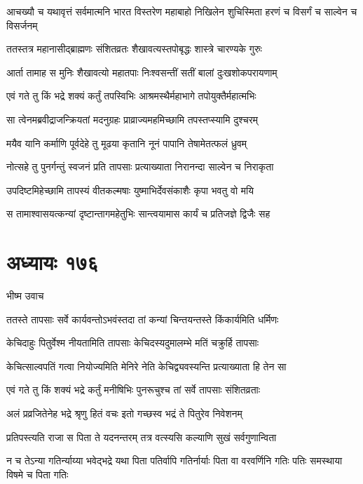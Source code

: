 \threelineshloka
{आचख्यौ च यथावृत्तं सर्वमात्मनि भारत}
{विस्तरेण महाबाहो निखिलेन शुचिस्मिता}
{हरणं च विसर्गं च साल्वेन च विसर्जनम्}


\twolineshloka
{ततस्तत्र महानासीद्ब्राह्मणः संशितव्रतः}
{शैखावत्यस्तपोबृद्धः शास्त्रे चारण्यके गुरुः}


\twolineshloka
{आर्ता तामाह स मुनिः शैखावत्यो महातपाः}
{निःश्वसन्तीं सतीं बालां दुःखशोकपरायणाम्}


\twolineshloka
{एवं गते तु किं भद्रे शक्यं कर्तुं तपस्विभिः}
{आश्रमस्थैर्महाभागे तपोयुक्तैर्महात्मभिः}


\twolineshloka
{सा त्वेनमब्रवीद्राजन्क्रियतां मदनुग्रहः}
{प्राव्राज्यमहमिच्छामि तपस्तप्स्यामि दुश्चरम्}


\twolineshloka
{मयैव यानि कर्माणि पूर्वदेहे तु मूढया}
{कृतानि नूनं पापानि तेषामेतत्फलं ध्रुवम्}


\twolineshloka
{नोत्सहे तु पुनर्गन्तुं स्वजनं प्रति तापसाः}
{प्रत्याख्याता निरानन्दा साल्वेन च निराकृता}


\twolineshloka
{उपदिष्टमिहेच्छामि तापस्यं वीतकल्मषाः}
{युष्माभिर्देवसंकाशैः कृपा भवतु वो मयि}


\twolineshloka
{स तामाश्वासयत्कन्यां दृष्टान्तागमहेतुभिः}
{सान्त्वयामास कार्यं च प्रतिजज्ञे द्विजैः सह}


\chapter{अध्यायः १७६}
\twolineshloka
{भीष्म उवाच}
{}


\twolineshloka
{ततस्ते तापसाः सर्वे कार्यवन्तोऽभवंस्तदा}
{तां कन्यां चिन्तयन्तस्ते किंकार्यमिति धर्मिणः}


\twolineshloka
{केचिदाहुः पितुर्वेश्म नीयतामिति तापसाः}
{केचिदस्यदुमालम्भे मतिं चक्रुर्हि तापसाः}


\twolineshloka
{केचित्साल्वपतिं गत्वा नियोज्यमिति मेनिरे}
{नेति केचिद्व्यवस्यन्ति प्रत्याख्याता हि तेन सा}


\twolineshloka
{एवं गते तु किं शक्यं भद्रे कर्तुं मनीषिभिः}
{पुनरूचुश्च तां सर्वे तापसाः संशितव्रताः}


\twolineshloka
{अलं प्रव्रजितेनेह भद्रे श्रृणु हितं वचः}
{इतो गच्छस्व भद्रं ते पितुरेव निवेशनम्}


\twolineshloka
{प्रतिपस्त्यति राजा स पिता ते यदनन्तरम्}
{तत्र वत्स्यसि कल्याणि सुखं सर्वगुणान्विता}


\threelineshloka
{न च तेऽन्या गतिर्न्याय्या भवेद्भद्रे यथा पिता}
{पतिर्वापि गतिर्नार्याः पिता वा वरवर्णिनि}
{गतिः पतिः समस्थाया विषमे च पिता गतिः}


